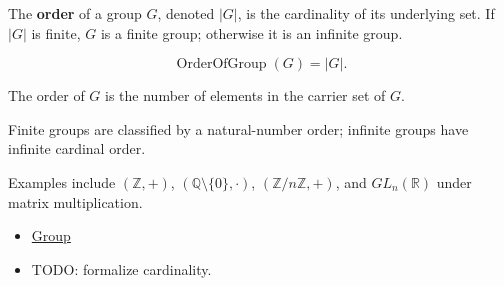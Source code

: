 \begin{definition}
\label{def:order-of-a-group}
The \textbf{order} of a group $G$, denoted $|G|$, is the cardinality of its
underlying set.  If $|G|$ is finite, $G$ is a finite group; otherwise it is an
infinite group.
\end{definition}

\begin{remark*}
\[
\operatorname{OrderOfGroup}(G)=|G|.
\]
\end{remark*}

\begin{remark*}
The order of $G$ is the number of elements in the carrier set of $G$.
\end{remark*}


\begin{remark*}[Interpretation]
Finite groups are classified by a natural-number order; infinite groups have
infinite cardinal order.
\end{remark*}

\begin{remark*}[Examples]
Examples include $(\mathbb{Z},+)$, $(\mathbb{Q}\setminus\{0\},\cdot)$,
$(\mathbb{Z}/n\mathbb{Z},+)$, and $GL_n(\mathbb{R})$ under matrix
multiplication.
\end{remark*}

\begin{dependencies}
\begin{itemize}
  \item \hyperref[def:algebraic-group]{Group}
  \item TODO: formalize cardinality.
\end{itemize}
\end{dependencies}
